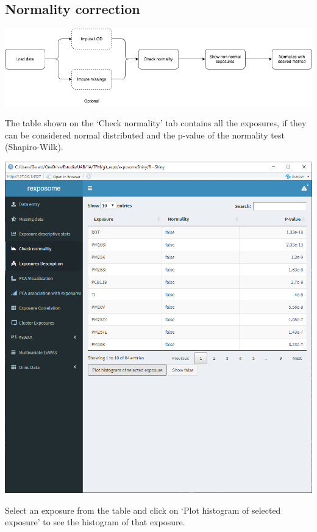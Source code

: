 \documentclass[
]{book}
\begin{document}
\hypertarget{normality-correction}{%
\subsection{Normality correction}\label{normality-correction}}

\includegraphics{images/analysis3_1.png}

The table shown on the `Check normality' tab contains all the exposures, if they can be considered normal distributed and the p-value of the normality test (Shapiro-Wilk).

\includegraphics{images/analysis3_2.png}

Select an exposure from the table and click on `Plot histogram of selected exposure' to see the histogram of that exposure.
\end{document}
